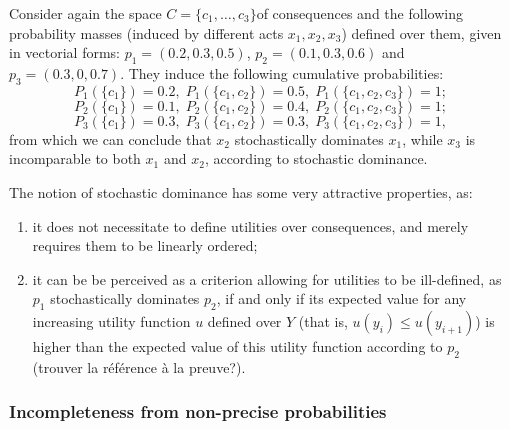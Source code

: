 \documentclass[french, english]{llncs}
\begin{document}
	\begin{example}
		Consider again the space $C=\{c_1,\ldots,c_3\}$of consequences and the following probability masses (induced by different acts $x_1,x_2,x_3$) defined over them, given in vectorial forms: $p_1=(0.2,0.3,0.5)$, $p_2=(0.1,0.3,0.6)$ and $p_3=(0.3,0,0.7)$. They induce the following cumulative probabilities:
		$$P_1(\{c_1\})=0.2, \; P_1(\{c_1,c_2\})=0.5, \; P_1(\{c_1,c_2,c_3\})=1; $$
		$$P_2(\{c_1\})=0.1, \; P_2(\{c_1,c_2\})=0.4, \; P_2(\{c_1,c_2,c_3\})=1;$$
		$$P_3(\{c_1\})=0.3, \; P_3(\{c_1,c_2\})=0.3, \; P_3(\{c_1,c_2,c_3\})=1, $$
		from which we can conclude that $x_2$ stochastically dominates $x_1$, while $x_3$ is incomparable to both $x_1$ and $x_2$, according to stochastic dominance.
	\end{example}
	
	The notion of stochastic dominance has some very attractive properties, as:
	\begin{enumerate}
		\item it does not necessitate to define utilities over consequences, and merely requires them to be linearly ordered;
		\item it can be be perceived as a criterion allowing for utilities to be ill-defined, as $p_1$ stochastically dominates $p_2$, if and only if its expected value for any increasing utility function $u$ defined over $Y$ (that is, $u(y_i) \leq u(y_{i+1})$)  is higher than the expected value of this utility function according to $p_2$ (trouver la référence à la preuve?). 
	\end{enumerate}
	
	\subsubsection{Incompleteness from non-precise probabilities}
	
\end{document}
